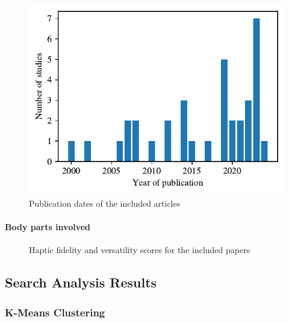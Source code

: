 \begin{figure}[htbp]
    \centering
    \includegraphics[width=\columnwidth]{figures/years.pdf} 
    \caption{Publication dates of the included articles}
    \label{fig:years}
\end{figure} 


\paragraph{Body parts involved}


\begin{figure}[htbp]

\caption{Haptic fidelity and versatility scores for the included papers}
\label{fig:fidelity_plot}
\end{figure}


\subsection{Search Analysis Results}

\subsubsection{K-Means Clustering}

